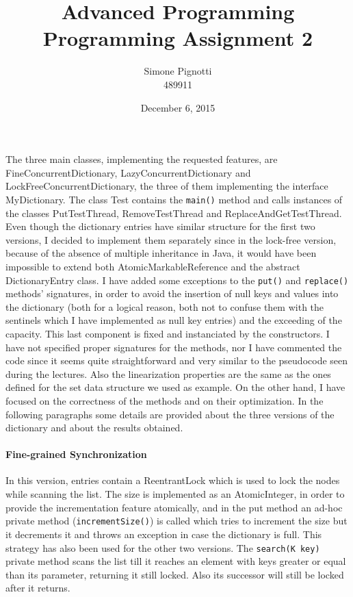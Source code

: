 \documentclass[a4paper]{article}
\title{Advanced Programming\\Programming Assignment 2}
\author{Simone Pignotti  \\
	489911  \\
	}
\date{December 6, 2015}
\begin{document}
\maketitle

The three main classes, implementing the requested features, are FineConcurrentDictionary, LazyConcurrentDictionary and LockFreeConcurrentDictionary, the three of them implementing the interface MyDictionary. The class Test contains the \texttt{main()} method and calls instances of the classes PutTestThread, RemoveTestThread and ReplaceAndGetTestThread. Even though the dictionary entries have similar structure for the first two versions, I decided to implement them separately since in the lock-free version, because of the absence of multiple inheritance in Java, it would have been impossible to extend both AtomicMarkableReference and the abstract DictionaryEntry class. I have added some exceptions to the \texttt{put()} and \texttt{replace()} methods' signatures, in order to avoid the insertion of null keys and values into the dictionary (both for a logical reason, both not to confuse them with the sentinels which I have implemented as null key entries) and the exceeding of the capacity. This last component is fixed and instanciated by the constructors. I have not specified proper signatures for the methods, nor I have commented the code since it seems quite straightforward and very similar to the pseudocode seen during the lectures. Also the linearization properties are the same as the ones defined for the set data structure we used as example. On the other hand, I have focused on the correctness of the methods and on their optimization. In the following paragraphs some details are provided about the three versions of the dictionary and about the results obtained.

\paragraph{Fine-grained Synchronization}
In this version, entries contain a ReentrantLock which is used to lock the nodes while scanning the list. The size is implemented as an AtomicInteger, in order to provide the incrementation feature atomically, and in the put method an ad-hoc private method (\texttt{incrementSize()}) is called which tries to increment the size but it decrements it and throws an exception in case the dictionary is full. This strategy has also been used for the other two versions. The \texttt{search(K key)} private method scans the list till it reaches an element with keys greater or equal than its parameter, returning it still locked. Also its successor will still be locked after it returns.
\end{document}
